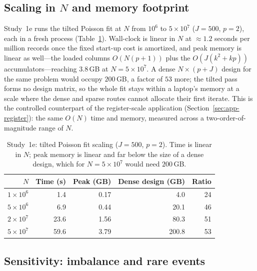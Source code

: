 \documentclass[11pt]{article}
\begin{document}
\subsection{Scaling in $N$ and memory footprint}\label{sec:sim-scaling}

Study~1e runs the tilted Poisson fit at $N$ from $10^6$ to $5\times10^7$
($J = 500$, $p = 2$), each in a fresh process
(Table~\ref{tab:scaling}).  Wall-clock is linear in $N$ at
$\approx\!1.2$ seconds per million records once the fixed start-up cost
is amortized, and peak memory is linear as well---the loaded columns
$O(N(p+1))$ plus the $O(J(k^2 + kp))$ accumulators---reaching
$3.8$\,GB at $N = 5\times10^7$.  A dense $N \times (p + J)$ design for the
same problem would occupy $200$\,GB, a factor of $53$ more; the tilted
pass forms no design matrix, so the whole fit stays within a laptop's
memory at a scale where the dense and sparse routes cannot allocate their
first iterate.  This is the controlled counterpart of the register-scale
application (Section~\ref{sec:app-register}): the same $O(N)$ time and
memory, measured across a two-order-of-magnitude range of $N$.

\begin{table}[t]
\centering
\caption{Study~1e: tilted Poisson fit scaling ($J = 500$, $p = 2$).
Time is linear in $N$; peak memory is linear and far below the size of a
dense design, which for $N = 5\times10^7$ would need $200$\,GB.}
\label{tab:scaling}
\small
\begin{tabular}{rrrrr}
\toprule
$N$ & Time (s) & Peak (GB) & Dense design (GB) & Ratio \\
\midrule
$1\times10^6$ & 1.4  & 0.17 & 4.0   & 24 \\
$5\times10^6$ & 6.9  & 0.44 & 20.1  & 46 \\
$2\times10^7$ & 23.6 & 1.56 & 80.3  & 51 \\
$5\times10^7$ & 59.6 & 3.79 & 200.8 & 53 \\
\bottomrule
\end{tabular}
\end{table}

\subsection{Sensitivity: imbalance and rare events}
\label{sec:sim-sensitivity}
\end{document}
